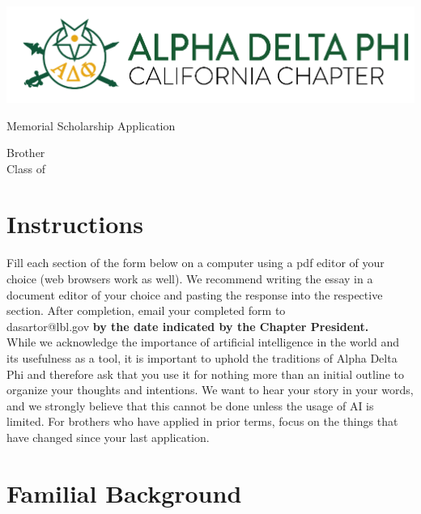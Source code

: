 \documentclass{article}
\begin{document}
\includegraphics{letterhead.png}
\begin{center}
	\LARGE{Memorial Scholarship Application}
\end{center}

\begin{Form} %

\begin{center}
	\Large{Brother \TextField[name=name, width=3cm, height=12pt, backgroundcolor=lightgrey, bordercolor=lightgrey, borderwidth=0]{}\\[10pt]}
	Class of \TextField[name=class, width=2cm, height=12pt, backgroundcolor=lightgrey, bordercolor=lightgrey, borderwidth=0]{}\\[10pt]
\end{center}

\section{Instructions}
Fill each section of the form below on a computer using a pdf editor of your choice (web browsers work as well). 
We recommend writing the essay in a document editor of your choice and pasting the response into the respective section.
After completion, email your completed form to\\dasartor@lbl.gov \textbf{by the date indicated by the Chapter President.}\\[12pt]
While we acknowledge the importance of artificial intelligence in the world and its usefulness as a tool, it is important to uphold the traditions of Alpha Delta Phi and therefore ask that you use it for nothing more than an initial outline to organize your thoughts and intentions.
We want to hear your story in your words, and we strongly believe that this cannot be done unless the usage of AI is limited.
For brothers who have applied in prior terms, focus on the things that have changed since your last application.

\pagebreak
\pagestyle{body}
\section*{Familial Background}

\end{Form}
\end{document}
